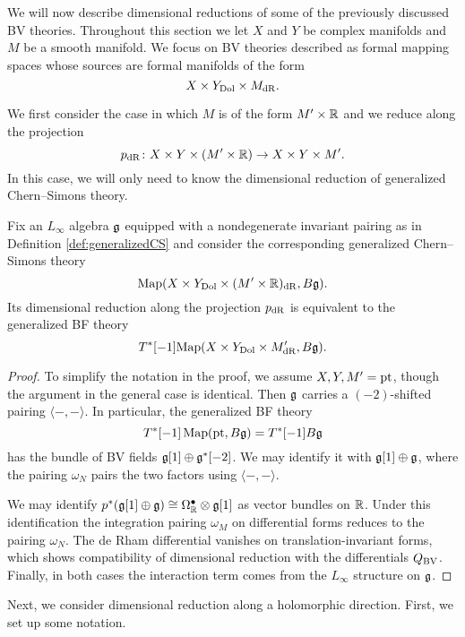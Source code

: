 \documentclass[10pt, oneside]{article}
\begin{document}
We will now describe dimensional reductions of some of the previously discussed BV theories.
Throughout this section we let $X$ and $Y$ be complex manifolds and $M$ be a smooth manifold. 
We focus on BV theories described as formal mapping spaces whose sources are formal manifolds of the form 
\begin{equation}\label{eqn: generalized}
X \times Y_{\rm Dol} \times M_{\rm dR} .
\end{equation}

We first consider the case in which $M$ is of the form $M' \times \mathbb R$ and we reduce along the projection
\[p_{\rm dR} \colon X \times Y \times (M' \times \mathbb R) \to X \times Y \times M' .\]
In this case, we will only need to know the dimensional reduction of generalized Chern--Simons theory.

\begin{prop} \label{CS_to_BF_diml_red_prop}
Fix an $L_\infty$ algebra $\mathfrak g$ equipped with a nondegenerate invariant pairing as in Definition \ref{def:generalizedCS} and consider the corresponding generalized Chern--Simons theory
\[\operatorname{Map}(X\times Y_{\mathrm{Dol}}\times (M'\times \mathbb R)_{\mathrm{dR}}, B\mathfrak g).\]
Its dimensional reduction along the projection $p_{\rm dR}$ is equivalent to the generalized BF theory
\[
T^*[-1] {\rm Map}(X\times Y_{\mathrm{Dol}}\times M'_{\mathrm{dR}}, B\mathfrak g) .
\]
\end{prop}

\begin{proof}
To simplify the notation in the proof, we assume $X,Y,M'=\operatorname{pt}$, though the argument in the general case is identical. Then $\mathfrak g$ carries a $(-2)$-shifted pairing $\langle-,-\rangle$. In particular, the generalized BF theory
\[T^*[-1] \operatorname{Map}(\operatorname{pt}, B \mathfrak g) = T^*[-1] B \mathfrak g\]
has the bundle of BV fields $\mathfrak g[1] \oplus \mathfrak g^*[-2]$. We may identify it with $\mathfrak g[1]\oplus \mathfrak g$, where the pairing $\omega_N$ pairs the two factors using $\langle-,-\rangle$.

We may identify $p^*(\mathfrak g[1]\oplus \mathfrak g)\cong \Omega^\bullet_{\mathbb R}\otimes \mathfrak g[1]$ as vector bundles on $\mathbb R$. 
Under this identification the integration pairing $\omega_M$ on differential forms reduces to the pairing $\omega_N$. The de Rham differential vanishes on translation-invariant forms, which shows compatibility of dimensional reduction with the differentials $Q_{\mathrm{BV}}$. Finally, in both cases the interaction term comes from the $L_\infty$ structure on $\mathfrak g$.
\end{proof}

Next, we consider dimensional reduction along a holomorphic direction. 
First, we set up some notation.
\end{document}
